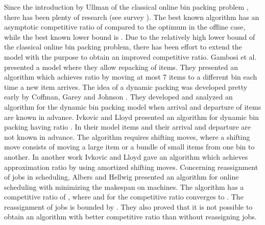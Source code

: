 \documentclass[a4paper,11pt]{article}
\begin{document}
Since the introduction by Ullman of the classical online bin packing problem \cite{ullman1971}, there has been 
plenty of research 
(see survey \cite {csirik1998}). The best known algorithm has an asymptotic competitive
ratio of  \cite{seiden2002} compared to the optimum in the offline case, 
while the best known lower bound is  \cite{balogh2010}.
Due to the relatively high lower bound of the classical online bin packing problem, there has been effort
to extend the model with the purpose to obtain an improved competitive ratio.
Gambosi et al. \cite{gambosi2000} presented a model where they allow repacking of items. 
They presented an algorithm 
which achieves ratio  by moving at most 7 items to a different bin each time
a new item arrives.
The idea of a dynamic packing was developed pretty early by Coffman, Garey and Johnson \cite{coffman1983}.
They developed and analyzed an algorithm for the dynamic bin packing model when arrival and departure of items
are known in advance.
Ivkovic and Lloyd \cite{ivkovic1998} presented an algorithm for dynamic bin packing having ratio .
In their model items and their arrival and departure are not known in advance.
The algorithm requires  shifting moves, where a shifting move consists of moving a 
large item or a bundle of small items from one bin to another. 
In another work Ivkovic and Lloyd \cite{ivkovic1997} gave an algorithm which achieves approximation
ratio  by using amortized  shifting moves.
Concerning reassignment of jobs in scheduling, Albers and Hellwig \cite{albers2012} 
presented an algorithm for online scheduling with minimizing the makespan on  machines. 
The algorithm has a competitive ratio
of , where  and for  the competitive ratio  converges 
to . The reassignment of jobs is bounded by . 
They also proved that it is not possible to obtain an algorithm with better competitive ratio than 
without reassigning  jobs.
\end{document}
